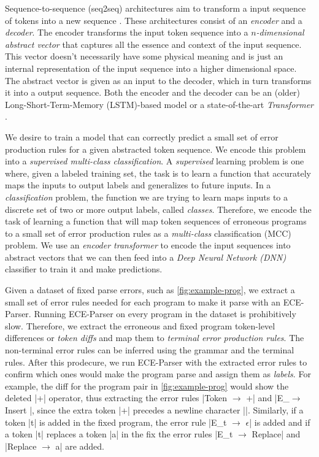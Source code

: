  Sequence-to-sequence (seq2seq) architectures aim to
transform a input sequence of tokens into a new sequence \citep{Sutskever_2014}.
These architectures consist of an \emph{encoder} and a \emph{decoder}. The
encoder transforms the input token sequence into a \emph{$n$-dimensional
abstract vector} that captures all the essence and context of the input
sequence. This vector doesn't necessarily have some physical meaning and is just
an internal representation of the input sequence into a higher dimensional
space. The abstract vector is given as an input to the decoder, which in turn
transforms it into a output sequence. Both the encoder and the decoder can be an
(older) Long-Short-Term-Memory (LSTM)-based model \citep{Hochreiter_1997} or a
state-of-the-art \emph{Transformer} \citep{Vaswani_2017}.

We desire to train a model that can correctly predict a small set of error
production rules for a given abstracted token sequence. We encode this problem
into a \emph{supervised multi-class classification}. A \emph{supervised}
learning problem is one where, given a labeled training set, the task is to
learn a function that accurately maps the inputs to output labels and
generalizes to future inputs. In a \emph{classification} problem, the function
we are trying to learn maps inputs to a discrete set of two or more output
labels, called \emph{classes}. Therefore, we encode the task of learning a
function that will map token sequences of erroneous programs to a small set of
error production rules as a \emph{multi-class} classification (MCC) problem. We
use an \emph{encoder transformer} to encode the input sequences into abstract
vectors that we can then feed into a \emph{Deep Neural Network (DNN)} classifier
to train it and make predictions.

Given a dataset of fixed parse errors, such as \autoref{fig:example-prog}, we
extract a small set of error rules needed for each program to make it parse with
an ECE-Parser. Running ECE-Parser on every program in the dataset is
prohibitively slow. Therefore, we extract the erroneous and fixed program
token-level differences or \emph{token diffs} and map them to \emph{terminal
error production rules}. The non-terminal error rules can be inferred using the
grammar and the terminal rules. After this prodecure, we run ECE-Parser with the
extracted error rules to confirm which ones would make the program parse and
assign them as \emph{labels}. For example, the diff for the program pair in
\autoref{fig:example-prog} would show the deleted |+| operator, thus extracting
the error rules |Token $\rightarrow$ +| and |E_\n $\rightarrow$ Insert \n|,
since the extra token |+| precedes a newline character |\n|. Similarly, if a
token |t| is added in the fixed program, the error rule
%
|E_t $\rightarrow$ $\epsilon$| is added and if a token |t| replaces a token |a|
in the fix the error rules |E_t $\rightarrow$ Replace| and
%
|Replace $\rightarrow$ a| are added.

